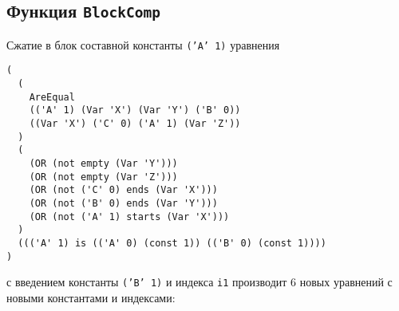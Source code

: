 \documentclass[12pt]{article}
\def\mir#1{\texttt{#1}} %
\begin{document}
\subsection{Функция \texttt{BlockComp}}

Сжатие в блок составной константы \mir{('A' 1)} уравнения
\begin{verbatim}
(
  (
    AreEqual
    (('A' 1) (Var 'X') (Var 'Y') ('B' 0))
    ((Var 'X') ('C' 0) ('A' 1) (Var 'Z'))
  )
  (
    (OR (not empty (Var 'Y')))
    (OR (not empty (Var 'Z')))
    (OR (not ('C' 0) ends (Var 'X')))
    (OR (not ('B' 0) ends (Var 'Y')))
    (OR (not ('A' 1) starts (Var 'X')))
  )
  ((('A' 1) is (('A' 0) (const 1)) (('B' 0) (const 1))))
)
\end{verbatim}
с введением константы \mir{('B' 1)} и индекса \mir{i1} производит 6 новых
уравнений с новыми константами и индексами:
\end{document}
